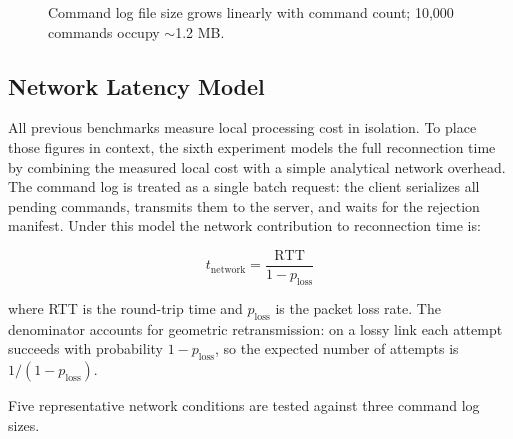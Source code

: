 \documentclass{article}
\begin{document}
\begin{figure}[h]
\centering
{}
\caption{Command log file size grows linearly with command count; 10{,}000 commands occupy $\sim$1.2 MB.}
\label{fig:diskfootprint}
\end{figure}

\subsection{Network Latency Model}

All previous benchmarks measure local processing cost in isolation. To place those figures in context, the sixth experiment models the full reconnection time by combining the measured local cost with a simple analytical network overhead. The command log is treated as a single batch request: the client serializes all pending commands, transmits them to the server, and waits for the rejection manifest. Under this model the network contribution to reconnection time is:

\[
t_{\text{network}} = \frac{\text{RTT}}{1 - p_{\text{loss}}}
\]

where RTT is the round-trip time and $p_{\text{loss}}$ is the packet loss rate. The denominator accounts for geometric retransmission: on a lossy link each attempt succeeds with probability $1 - p_{\text{loss}}$, so the expected number of attempts is $1/(1-p_{\text{loss}})$.

Five representative network conditions are tested against three command log sizes.
\end{document}
